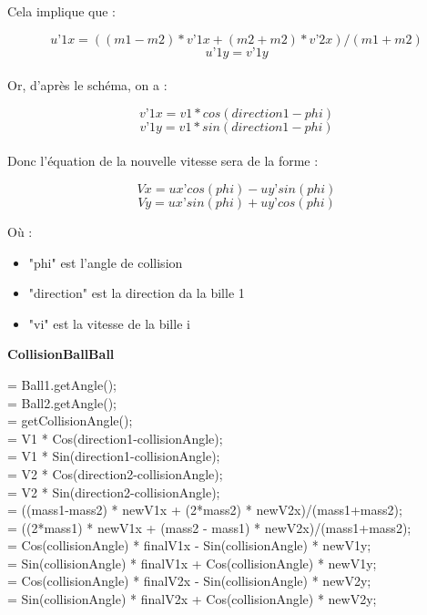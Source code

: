 \documentclass{report}
\begin{document}
\newpage
Cela implique que :

\[u’1x = ((m1-m2)*v’1x+(m2+m2)*v’2x)/(m1+m2)\]
\[u’1y = v’1y\] \\

Or, d'après le schéma, on a :

\[v’1x = v1*cos(direction1-phi)\]
\[v’1y = v1*sin(direction1-phi)\] \\

Donc l'équation de la nouvelle vitesse sera de la forme :

\[Vx = ux’ cos(phi) - uy’ sin(phi)\]
\[Vy = ux’ sin(phi) + uy’ cos(phi)\]

Où :

\begin{itemize}
\item "phi" est l'angle de collision
\item "direction" est la direction da la bille 1
\item "vi" est la vitesse de la bille i
\end{itemize}


\begin{algorithm}[h]
\KwOut{}
    \caption{{\bf CollisionBallBall} \label{CollisionBallBall}}
    = Ball1.getAngle();\\
    = Ball2.getAngle();\\
    = getCollisionAngle();\\
    = V1 * Cos(direction1-collisionAngle);\\ 
    = V1 * Sin(direction1-collisionAngle);\\
    = V2 * Cos(direction2-collisionAngle);\\ 
    = V2 * Sin(direction2-collisionAngle);\\
    = ((mass1-mass2) * newV1x + (2*mass2) * newV2x)/(mass1+mass2);\\ 
    = ((2*mass1) * newV1x + (mass2 - mass1) * newV2x)/(mass1+mass2);\\
    = Cos(collisionAngle) * finalV1x - Sin(collisionAngle) * newV1y;\\
    = Sin(collisionAngle) * finalV1x + Cos(collisionAngle) * newV1y;\\
    = Cos(collisionAngle) * finalV2x - Sin(collisionAngle) * newV2y;\\
    = Sin(collisionAngle) * finalV2x + Cos(collisionAngle) * newV2y;
\end{algorithm}
\end{document}
